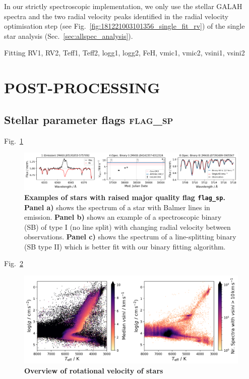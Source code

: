 \documentclass[
  journal=pasa,
  manuscript=research-paper, %
  year=2023,
  volume=37
]{cup-journal}
\begin{document}
In our strictly spectroscopic implementation, we only use the stellar GALAH spectra and the two radial velocity peaks identified in the radial velocity optimisation step (see Fig.~\ref{fig:181221003101356_single_fit_rv}) of the single star analysis (Sec.~\ref{sec:allspec_analysis}).

Fitting RV1, RV2, Teff1, Teff2, logg1, logg2, FeH, vmic1, vmic2, vsini1, vsini2


\newpage
\section{POST-PROCESSING}
\label{sec:post_processing}

\subsection{Stellar parameter flags \textsc{flag\_sp}}
\label{sec:flag_sp}

Fig.~\ref{fig:examples_flag_sp}



\begin{figure}[ht]
 \centering
 \includegraphics[width=\textwidth]{figures/examples_flag_sp.png}
 \caption{\textbf{Examples of stars with raised major quality flag \texttt{flag\_sp}.}
 \textbf{Panel a)} shows the spectrum of a star with Balmer lines in emission. \textbf{Panel b)} shows an example of a spectroscopic binary (SB) of type I (no line split) with changing radial velocity between observations. \textbf{Panel c)} shows the spectrum of a line-splitting binary (SB type II) which is better fit with our binary fitting algorithm.} \label{fig:examples_flag_sp}
\end{figure}

Fig.~\ref{fig:teff_logg_vsini}

\begin{figure}[ht]
 \centering
 \includegraphics[width=\textwidth]{figures/teff_logg_vsini.png}
 \caption{
 \textbf{Overview of rotational velocity of stars}
} \label{fig:teff_logg_vsini}
\end{figure}
\end{document}
